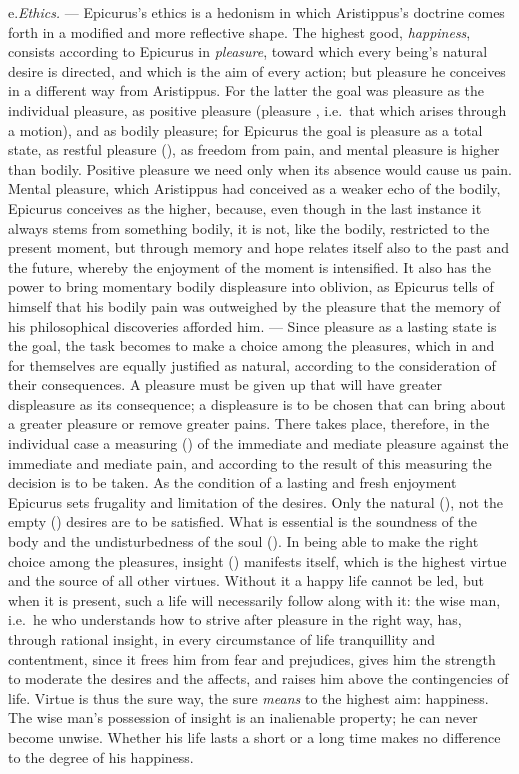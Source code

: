 \divrule

e.\enspace \emph{Ethics.} --- Epicurus's ethics is a hedonism in which
Aristippus's doctrine comes forth in a modified and more reflective
shape. The highest good, \emph{happiness}, consists according to
Epicurus in \emph{pleasure}, toward which every being's natural desire
is directed, and which is the aim of every action; but pleasure he
conceives in a different way from Aristippus. For the latter the goal
was pleasure as the individual pleasure, as positive pleasure (pleasure
, i.e.\ that which arises through a motion), and as
bodily pleasure; for Epicurus the goal is pleasure as a total state, as
restful pleasure (), as freedom from pain, and
mental pleasure is higher than bodily. Positive pleasure we need only
when its absence would cause us pain. Mental pleasure, which Aristippus
had conceived as a weaker echo of the bodily, Epicurus conceives as the
higher, because, even though in the last instance it always stems from
something bodily, it is not, like the bodily, restricted to the present
moment, but through memory and hope relates itself also to the past and
the future, whereby the enjoyment of the moment is intensified. It also
has the power to bring momentary bodily displeasure into oblivion, as
Epicurus tells of himself that his bodily pain was
outweighed by the pleasure that the memory of his philosophical
discoveries afforded him. --- Since pleasure as a lasting state is the
goal, the task becomes to make a choice among the pleasures, which in
and for themselves are equally justified as natural, according to the
consideration of their consequences. A pleasure must be given up that
will have greater displeasure as its consequence; a displeasure is to
be chosen that can bring about a greater pleasure or remove greater
pains. There takes place, therefore, in the individual case a measuring
() of the immediate and mediate pleasure against the
immediate and mediate pain, and according to the result of this
measuring the decision is to be taken. As the condition of a lasting
and fresh enjoyment Epicurus sets frugality and limitation of the
desires. Only the natural (), not the empty ()
desires are to be satisfied. What is essential is the soundness of the
body and the undisturbedness of the soul (). In being able to make the right choice among
the pleasures, insight () manifests itself, which is the
highest virtue and the source of all other virtues. Without it a happy
life cannot be led, but when it is present, such a life will
necessarily follow along with it: the wise man, i.e.\ he who
understands how to strive after pleasure in the right way, has, through
rational insight, in every circumstance of life tranquillity and
contentment, since it frees him from fear and prejudices, gives him the
strength to moderate the desires and the affects, and raises him above
the contingencies of life. Virtue is thus the sure way, the sure
\emph{means} to the highest aim: happiness. The wise man's possession of
insight is an inalienable property; he can never become unwise. Whether
his life lasts a short or a long time makes no difference to the degree
of his happiness.

